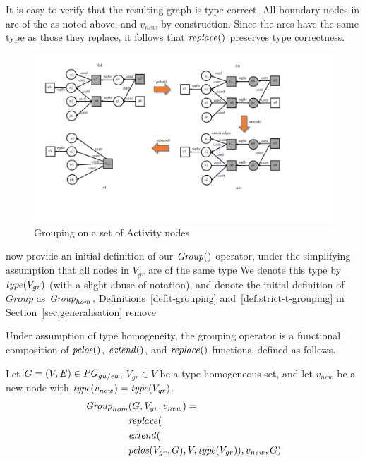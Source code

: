 It is easy to verify that the resulting graph is type-correct. All boundary nodes in   are of the  as noted above, and   $v_{new}$   by construction.
Since the arcs have the same type as those they replace, it follows that $\mathit{replace}()$ preserves type correctness.



\begin{figure}
\centering
\includegraphics[scale=.5]{reworked-fig8.pdf} 
\caption{Grouping on a set of Activity nodes} \label{fig:convex-a-only}
\end{figure}

 now provide an initial definition of our $\mathit{Group}()$ operator, under the simplifying assumption that all nodes in $V_{gr}$ are of the same type   We denote this type by $\mathit{type}(V_{gr})$ (with a slight abuse of notation), and denote the initial definition of $Group$ as $\mathit{Group}_{hom}$. Definitions~\ref{def:t-grouping} and~\ref{def:strict-t-grouping}  in Section~\ref{sec:generalisation} remove 


%
Under assumption of type homogeneity, the grouping operator is a functional composition of $\mathit{pclos}()$, $\mathit{extend}()$, and $\mathit{replace}()$ functions, defined as follows.

\vspace*{10pt}
\begin{definition}
Let $G=(V,E) \in \mathit{PG}_{gu/ea}$, $V_{gr} \in V$ be a type-homogeneous set, and let $v_{new}$ be a new node with $\mathit{type}(v_{new}) = \mathit{type}(V_{gr})$.
\begin{align*}
\group_{hom} &  (G, V_{gr}, v_{new}) = \\
 & \repl(  \\
 & \extend( \\
 & \clos(V_{gr},\jwb{G}), V, \type(V_{gr})), v_{new},  G ) 
\end{align*}
\label{def:homo-group}
\end{definition}


